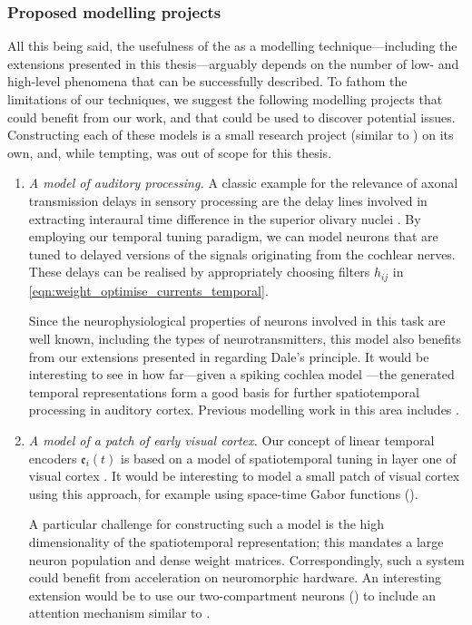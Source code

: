 \subsubsection{Proposed modelling projects}
All this being said, the usefulness of the \NEF as a modelling technique---including the extensions presented in this thesis---arguably depends on the number of low- and high-level phenomena that can be successfully described.
To fathom the limitations of our techniques, we suggest the following modelling projects that could benefit from our work, and that could be used to discover potential issues.
Constructing each of these models is a small research project (similar to ) on its own, and, while tempting, was out of scope for this thesis.
\begin{enumerate}[1.]
	\item \emph{A model of auditory processing.} A classic example for the relevance of axonal transmission delays in sensory processing are the delay lines involved in extracting interaural time difference in the superior olivary nuclei \citep[Chapter~31]{kandel2012principles}.
	By employing our temporal tuning paradigm, we can model neurons that are tuned to delayed versions of the signals originating from the cochlear nerves.
	These delays can be realised by appropriately choosing filters $h_{ij}$ in \cref{eqn:weight_optimise_currents_temporal}.

	Since the neurophysiological properties of neurons involved in this task are well known, including the types of neurotransmitters, this model also benefits from our extensions presented in  regarding Dale's principle.
	It would be interesting to see in how far---given a spiking cochlea model \citep[e.g.,][]{zilany2006modeling}---the generated temporal representations form a good basis for further spatiotemporal processing in auditory cortex.
	Previous modelling work in this area includes \citet{bekolay2016biologically}.

	\item \emph{A model of a patch of early visual cortex.}
	Our concept of linear temporal encoders $\mathfrak{e}_i(t)$ is based on a model of spatiotemporal tuning in layer one of visual cortex \citep{carandini1999linearity}.
	It would be interesting to model a small patch of visual cortex using this approach, for example using space-time Gabor functions ().

	A particular challenge for constructing such a model is the high dimensionality of the spatiotemporal representation; this mandates a large neuron population and dense weight matrices.
	Correspondingly, such a system could benefit from acceleration on neuromorphic hardware.
	An interesting extension would be to use our two-compartment \LIF neurons () to include an attention mechanism similar to \citet{bobier2014unifying}.


\end{enumerate}
